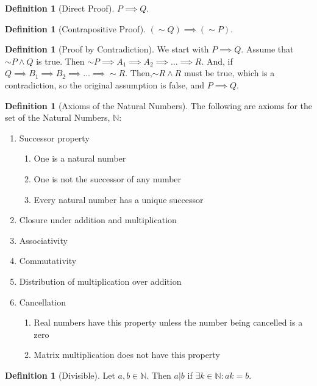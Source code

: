 \documentclass[10pt]{article}
\theoremstyle{definition}
\newtheorem{definition}[equation]{Definition}
\newcommand{\N}{\mathbb{N}}
\begin{document}
\begin{definition}[Direct Proof]
  $P\implies Q$.
\end{definition}

\begin{definition}[Contrapositive Proof]
  $(\sim Q) \implies (\sim P)$.
\end{definition}

\begin{definition}[Proof by Contradiction]
  We start with $P \implies Q$. Assume that $\sim P \land Q$ is true. Then $\sim P \implies A_1 \implies A_2 \implies \dots \implies R$. And, if $Q \implies B_1 \implies B_2 \implies \dots \implies \sim R$. Then,$\sim R \land R$ must be true, which is a contradiction, so the original assumption is false, and $P \implies Q$.
\end{definition}

\begin{definition}[Axioms of the Natural Numbers]
  The following are axioms for the set of the Natural Numbers, $\N$:
  \begin{enumerate}
    \item Successor property
    \begin{enumerate}
      \item One is a natural number
      \item One is not the successor of any number
      \item Every natural number has a unique successor
    \end{enumerate}
    \item Closure under addition and multiplication
    \item Associativity
    \item Commutativity
    \item Distribution of multiplication over addition
    \item Cancellation
    \begin{enumerate}
      \item Real numbers have this property unless the number being cancelled is a zero
      \item Matrix multiplication does not have this property
    \end{enumerate}
  \end{enumerate}
\end{definition}

\begin{definition}[Divisible]
  Let $a,b\in\N$. Then $a|b$ if $\exists k\in\N:ak=b$.
\end{definition}
\end{document}
